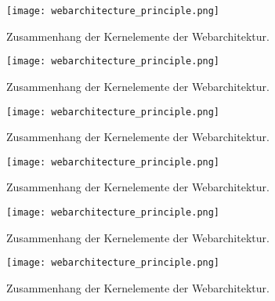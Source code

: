 \begin{figure}[H]
	\centering
	\texttt{[image: webarchitecture\_principle.png]}
	\caption[Zusammenhang der Kernelemente der Webarchitektur]{Zusammenhang der Kernelemente der Webarchitektur.\protect\footnotemark}
\end{figure}
\begin{figure}[H]
	\centering
	\texttt{[image: webarchitecture\_principle.png]}
	\caption[Zusammenhang der Kernelemente der Webarchitektur]{Zusammenhang der Kernelemente der Webarchitektur.\protect\footnotemark}
\end{figure}
\begin{figure}[H]
	\centering
	\texttt{[image: webarchitecture\_principle.png]}
	\caption[Zusammenhang der Kernelemente der Webarchitektur]{Zusammenhang der Kernelemente der Webarchitektur.\protect\footnotemark}
\end{figure}
\begin{figure}[H]
	\centering
	\texttt{[image: webarchitecture\_principle.png]}
	\caption[Zusammenhang der Kernelemente der Webarchitektur]{Zusammenhang der Kernelemente der Webarchitektur.\protect\footnotemark}
\end{figure}
\begin{figure}[H]
	\centering
	\texttt{[image: webarchitecture\_principle.png]}
	\caption[Zusammenhang der Kernelemente der Webarchitektur]{Zusammenhang der Kernelemente der Webarchitektur.\protect\footnotemark}
\end{figure}
\begin{figure}[H]
	\centering
	\texttt{[image: webarchitecture\_principle.png]}
	\caption[Zusammenhang der Kernelemente der Webarchitektur]{Zusammenhang der Kernelemente der Webarchitektur.\protect\footnotemark}
\end{figure}

